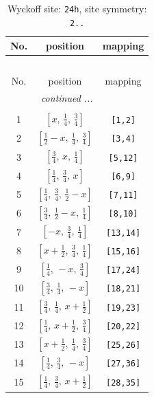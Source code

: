 \documentclass[fleqn,8pt]{jsarticle}
\begin{document}
\begin{longtable}{ccc}
\caption{Wyckoff site: {\tt 24h}, site symmetry: {\tt 2..}}
 \\
 \hline \hline
No. & position & mapping \\ \hline \endfirsthead

\multicolumn{2}{l}{\tablename\ \thetable{}} \\
 \hline \hline
No. & position & mapping \\ \hline \endhead

 \hline \hline
\multicolumn{2}{r}{\footnotesize\it continued ...} \\ \endfoot

 \hline \hline
\multicolumn{2}{r}{} \\ \endlastfoot

1 & $\left[ x,\, \frac{1}{4},\, \frac{3}{4} \right]$ & {\tt [1,2]} \\ \hline
2 & $\left[ \frac{1}{2} - x,\, \frac{1}{4},\, \frac{3}{4} \right]$ & {\tt [3,4]} \\ \hline
3 & $\left[ \frac{3}{4},\, x,\, \frac{1}{4} \right]$ & {\tt [5,12]} \\ \hline
4 & $\left[ \frac{1}{4},\, \frac{3}{4},\, x \right]$ & {\tt [6,9]} \\ \hline
5 & $\left[ \frac{1}{4},\, \frac{3}{4},\, \frac{1}{2} - x \right]$ & {\tt [7,11]} \\ \hline
6 & $\left[ \frac{3}{4},\, \frac{1}{2} - x,\, \frac{1}{4} \right]$ & {\tt [8,10]} \\ \hline
7 & $\left[ - x,\, \frac{3}{4},\, \frac{1}{4} \right]$ & {\tt [13,14]} \\ \hline
8 & $\left[ x + \frac{1}{2},\, \frac{3}{4},\, \frac{1}{4} \right]$ & {\tt [15,16]} \\ \hline
9 & $\left[ \frac{1}{4},\, - x,\, \frac{3}{4} \right]$ & {\tt [17,24]} \\ \hline
10 & $\left[ \frac{3}{4},\, \frac{1}{4},\, - x \right]$ & {\tt [18,21]} \\ \hline
11 & $\left[ \frac{3}{4},\, \frac{1}{4},\, x + \frac{1}{2} \right]$ & {\tt [19,23]} \\ \hline
12 & $\left[ \frac{1}{4},\, x + \frac{1}{2},\, \frac{3}{4} \right]$ & {\tt [20,22]} \\ \hline
13 & $\left[ x + \frac{1}{2},\, \frac{1}{4},\, \frac{3}{4} \right]$ & {\tt [25,26]} \\ \hline
14 & $\left[ \frac{1}{4},\, \frac{3}{4},\, - x \right]$ & {\tt [27,36]} \\ \hline
15 & $\left[ \frac{1}{4},\, \frac{3}{4},\, x + \frac{1}{2} \right]$ & {\tt [28,35]} \\ \hline

\end{longtable}
\end{document}
